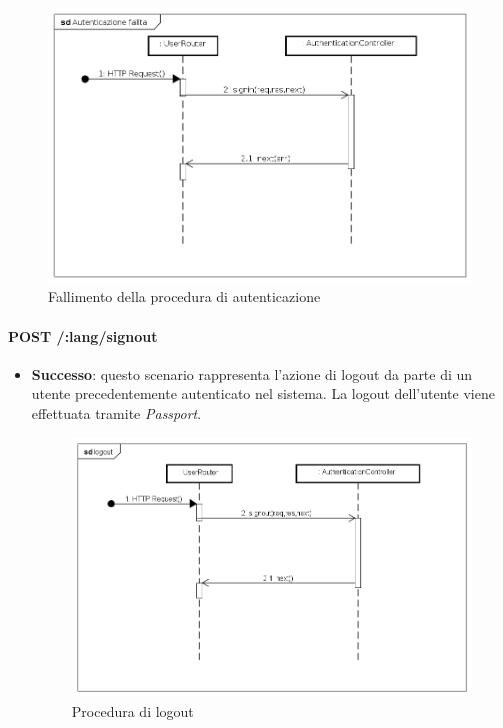 \begin{itemize}
\label{Fallimento della procedura di autenticazione}
\begin{figure}[ht]
	\centering
	\includegraphics[scale=0.40]{UML/DiagrammiDiSequenza/Back-end/POST__lang_signin_failure.png}
	\caption{Fallimento della procedura di autenticazione}
\end{figure}
\FloatBarrier

\end{itemize}

\paragraph{POST /:lang/signout}
\begin{itemize}
\item \textbf{Successo}: questo scenario rappresenta l'azione di logout da parte di un utente precedentemente autenticato nel sistema. La logout dell'utente viene effettuata tramite \textit{Passport}.

\label{Procedura di logout}
\begin{figure}[ht]
	\centering
	\includegraphics[scale=0.40]{UML/DiagrammiDiSequenza/Back-end/POST__lang_signout_success.png}
	\caption{Procedura di logout}
\end{figure}
\FloatBarrier

\end{itemize}

